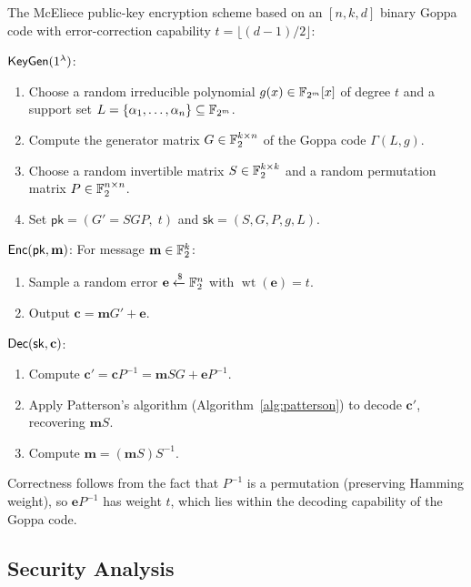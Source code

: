 \begin{definition}
\label{def:mceliece}
The McEliece public-key encryption scheme based on an $[n, k, d]$ binary Goppa code with error-correction capability $t = \lfloor(d-1)/2\rfloor$:

\medskip
\noindent$\mathsf{KeyGen}(1^\lambda)$:
\begin{enumerate}
\item Choose a random irreducible polynomial $g(x) \in \mathbb{F}_{2^m}[x]$ of degree $t$ and a support set $L = \{\alpha_1, \ldots, \alpha_n\} \subseteq \mathbb{F}_{2^m}$.
\item Compute the generator matrix $G \in \mathbb{F}_2^{k \times n}$ of the Goppa code $\Gamma(L, g)$.
\item Choose a random invertible matrix $S \in \mathbb{F}_2^{k \times k}$ and a random permutation matrix $P \in \mathbb{F}_2^{n \times n}$.
\item Set $\mathsf{pk} = (G' = SGP,\; t)$ and $\mathsf{sk} = (S, G, P, g, L)$.
\end{enumerate}

\medskip
\noindent$\mathsf{Enc}(\mathsf{pk}, \mathbf{m})$: For message $\mathbf{m} \in \mathbb{F}_2^k$:
\begin{enumerate}
\item Sample a random error $\mathbf{e} \getsr \F_2^n$ with $\operatorname{wt}(\mathbf{e}) = t$.
\item Output $\mathbf{c} = \mathbf{m}G' + \mathbf{e}$.
\end{enumerate}

\medskip
\noindent$\mathsf{Dec}(\mathsf{sk}, \mathbf{c})$:
\begin{enumerate}
\item Compute $\mathbf{c}' = \mathbf{c}P^{-1} = \mathbf{m}SG + \mathbf{e}P^{-1}$.
\item Apply Patterson's algorithm (Algorithm~\ref{alg:patterson}) to decode $\mathbf{c}'$, recovering $\mathbf{m}S$.
\item Compute $\mathbf{m} = (\mathbf{m}S)S^{-1}$.
\end{enumerate}
\end{definition}

Correctness follows from the fact that $P^{-1}$ is a permutation (preserving Hamming weight), so $\mathbf{e}P^{-1}$ has weight $t$, which lies within the decoding capability of the Goppa code.


\subsection{Security Analysis}
\label{subsec:mceliece-security}

